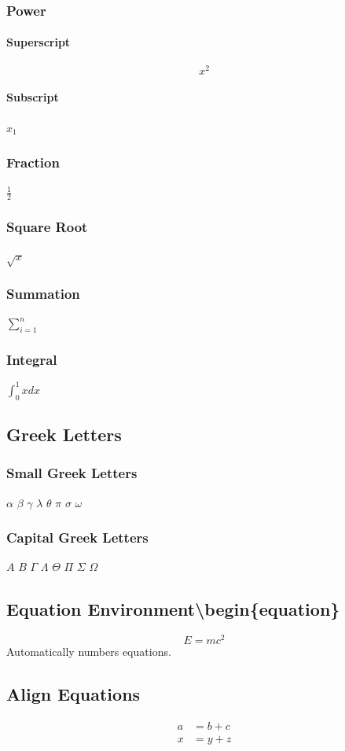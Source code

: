 \documentclass{article}
\begin{document}
\subsubsection{Power}
\paragraph{Superscript}
\[x^2\]
\paragraph{Subscript}
$x_1$
\subsubsection{Fraction}
$\frac{1}{2}$
\subsubsection{Square Root}
$\sqrt{x}$
\subsubsection{Summation}
$\sum_{i=1}^{n}$
\subsubsection{Integral}
$\int_0^1 x dx$
\subsection{Greek Letters}
\subsubsection{Small Greek Letters}
$\alpha$
$\beta$
$\gamma$
$\lambda$
$\theta$
$\pi$
$\sigma$
$\omega$
\subsubsection{Capital Greek Letters}
$A$
$B$
$\Gamma$
$\Lambda$
$\Theta$
$\Pi$
$\Sigma$
$\Omega$

\subsection{Equation Environment\textbackslash{begin\{equation\}}}
\begin{equation}
E=mc^2 \end{equation}
Automatically numbers equations.

\subsection{Align Equations}
\begin{align}
a &= b+c\\
x &= y+z
\end{align}
\end{document}
